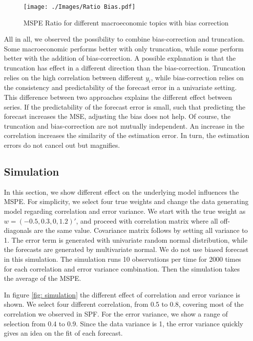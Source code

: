 \documentclass[11pt]{article}
\begin{document}
\begin{figure}[!h]
	\centering
	\texttt{[image: ./Images/Ratio Bias.pdf]}
	\caption{MSPE Ratio for different macroeconomic topics with bias correction}\label{fig: Ratio bias}
\end{figure}


All in all, we observed the possibility to combine bias-correction and truncation. Some macroeconomic performs better with only truncation, while some perform better with the addition of bias-correction. A possible explanation is that the truncation has effect in a different direction than the bias-correction. Truncation relies on the high correlation between different $y_i$, while bias-correction relies on the consistency and predictability of the forecast error in a univariate setting. This difference between two approaches explains the different effect between series. If the predictability of the forecast error is small, such that predicting the forecast increases the MSE, adjusting the bias does not help. Of course, the truncation and bias-correction are not mutually independent. An increase in the correlation increases the similarity of the estimation error. In turn, the estimation errors do not cancel out but magnifies. 



\subsection{Simulation}\label{simulation}
In this section, we show different effect on the underlying model influences the MSPE. For simplicity, we select four true weights and change the data generating model regarding correlation and error variance. We start with the true weight as $w=(-0.5,0.3,0,1.2)'$, and proceed with correlation matrix where all off-diagonals are the same value. Covariance matrix follows by setting all variance to 1. The error term is generated with univariate random normal distribution, while the forecasts are generated by multivariate normal. We do not use biased forecast in this simulation. The simulation runs 10 observations per time for 2000 times for each correlation and error variance combination. Then the simulation takes the average of the MSPE.

In figure \ref{fig: simulation} the different effect of correlation and error variance is shown. We select four different correlation, from 0.5 to 0.8, covering most of the correlation we observed in SPF. For the error variance, we show a range of selection from 0.4 to 0.9. Since the data variance is 1, the error variance quickly gives an idea on the fit of each forecast. 
\end{document}
